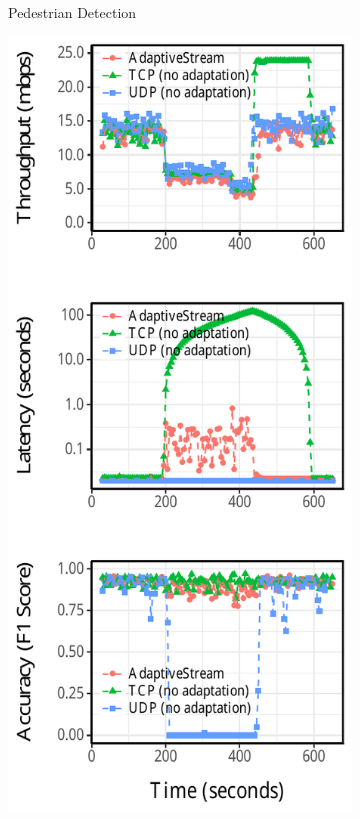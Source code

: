 \begin{figure}[!htb]
\begin{subfigure}[t]{0.3\textwidth}
    \caption{Pedestrian Detection}
    \label{fig:pd-runtime}
  \end{subfigure}
  \hfill
  \begin{subfigure}[t]{0.3\textwidth}
    \centering
    \includegraphics[width=\textwidth]{figures/runtime-darknet-verticle.pdf}

\end{subfigure}
\end{figure}

